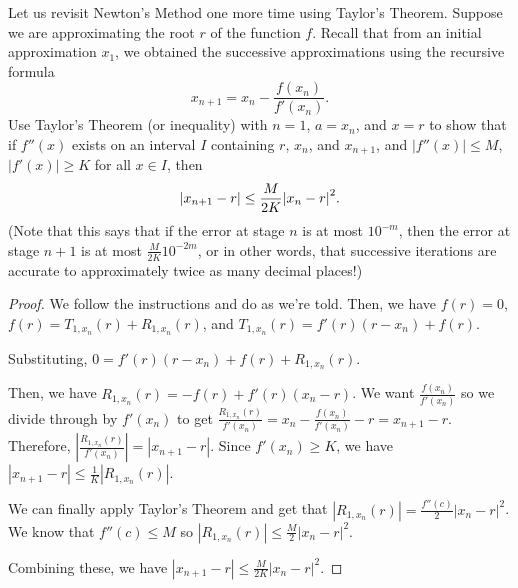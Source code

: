 \question Let us revisit Newton's Method one more time using Taylor's Theorem.
Suppose we are approximating the root $r$ of the function $f$.
Recall that from an initial approximation $x_1$,
we obtained the successive approximations using the recursive formula
\[ x_{n+1} = x_n - \frac{f(x_n)}{f'(x_n)}. \]
Use Taylor's Theorem (or inequality) with $n=1$, $a=x_n$, and $x=r$
to show that if $f''(x)$ exists on an interval $I$ containing $r$, $x_n$, and $x_{n+1}$,
and $|f''(x)| \leq M$, $|f'(x)| \geq K$ for all $x \in I$, then
\[ \abs{x_{n+1}-r} \leq \frac{M}{2K}\abs{x_n-r}^2. \]
(Note that this says that if the error at stage $n$ is at most $10^{-m}$,
then the error at stage $n+1$ is at most $\frac{M}{2K}10^{-2m}$, or in other words,
that successive iterations are accurate to approximately twice as many decimal places!)
\begin{proof}
  We follow the instructions and do as we're told.
  Then, we have $f(r) = 0$, $f(r) = T_{1,x_n}(r) + R_{1,x_n}(r)$, and $T_{1,x_n}(r) = f'(r)(r-x_n) + f(r)$.

  Substituting, $0 = f'(r)(r-x_n) + f(r) + R_{1,x_n}(r)$.

  Then, we have $R_{1,x_n}(r) = -f(r) + f'(r)(x_n-r)$.
  We want $\frac{f(x_n)}{f'(x_n)}$ so we divide through by $f'(x_n)$
  to get $\frac{R_{1,x_n}(r)}{f'(x_n)} = x_n - \frac{f(x_n)}{f'(x_n)} - r = x_{n+1} - r$.
  Therefore, $|\frac{R_{1,x_n}(r)}{f'(x_n)}| = |x_{n+1} - r|$.
  Since $f'(x_n) \geq K$, we have $|x_{n+1} - r| \leq \frac{1}{K}|R_{1,x_n}(r)|$.

  We can finally apply Taylor's Theorem and get that $|R_{1,x_n}(r)| = \frac{f''(c)}{2}|x_n-r|^2$.
  We know that $f''(c) \leq M$ so $|R_{1,x_n}(r)| \leq \frac{M}{2}|x_n-r|^2$.

  Combining these, we have $|x_{n+1} - r| \leq \frac{M}{2K}|x_n-r|^2$.
\end{proof}


